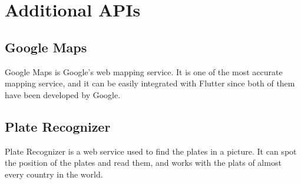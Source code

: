 \documentclass[../ITD.tex]{subfiles}
\begin{document}
    \section{Additional APIs}\label{sec:additional-apis}
    \subsection{Google Maps}\label{subsec:google-maps}
    Google Maps is Google's web mapping service.
    It is one of the most accurate mapping service, and it can be easily integrated with Flutter since both of them have been developed by Google.
    \subsection{Plate Recognizer}\label{subsec:plate-recognizer}
    Plate Recognizer is a web service used to find the plates in a picture.
    It can spot the position of the plates and read them, and works with the plats of almost every country in the world.
\end{document}
